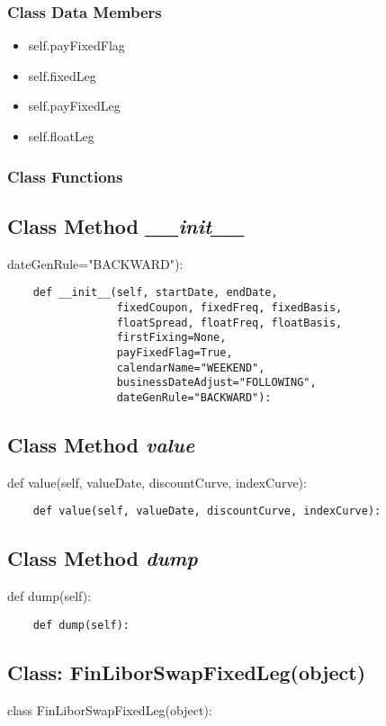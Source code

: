 \documentclass[twoside,11pt]{book}
\begin{document}
\subsubsection{Class Data Members}
\begin{itemize}
\item{self.payFixedFlag}
\item{self.fixedLeg}
\item{self.payFixedLeg}
\item{self.floatLeg}
\end{itemize}

\subsubsection{Class Functions}

\subsection{Class Method {\it \_\_init\_\_}}
dateGenRule="BACKWARD"):

\begin{lstlisting}
    def __init__(self, startDate, endDate,
                 fixedCoupon, fixedFreq, fixedBasis,
                 floatSpread, floatFreq, floatBasis,
                 firstFixing=None,
                 payFixedFlag=True,
                 calendarName="WEEKEND",
                 businessDateAdjust="FOLLOWING",
                 dateGenRule="BACKWARD"):
\end{lstlisting}

\subsection{Class Method {\it value}}
def value(self, valueDate, discountCurve, indexCurve):

\begin{lstlisting}
    def value(self, valueDate, discountCurve, indexCurve):
\end{lstlisting}

\subsection{Class Method {\it dump}}
def dump(self):

\begin{lstlisting}
    def dump(self):
\end{lstlisting}

\subsection{Class: FinLiborSwapFixedLeg(object)}
class FinLiborSwapFixedLeg(object):
\end{document}
